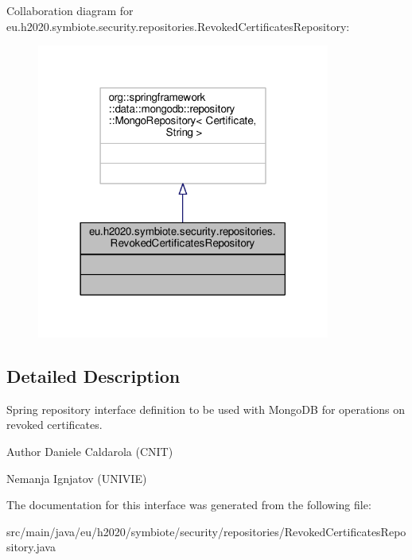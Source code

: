 Collaboration diagram for eu.\+h2020.\+symbiote.\+security.\+repositories.\+Revoked\+Certificates\+Repository\+:
\nopagebreak
\begin{figure}[H]
\begin{center}
\leavevmode
\includegraphics[width=273pt]{interfaceeu_1_1h2020_1_1symbiote_1_1security_1_1repositories_1_1RevokedCertificatesRepository__coll__graph}
\end{center}
\end{figure}


\subsection{Detailed Description}
Spring repository interface definition to be used with Mongo\+DB for operations on revoked certificates.

\begin{DoxyAuthor}{Author}
Daniele Caldarola (C\+N\+IT) 

Nemanja Ignjatov (U\+N\+I\+V\+IE) 
\end{DoxyAuthor}


The documentation for this interface was generated from the following file\+:\begin{DoxyCompactItemize}
\item 
src/main/java/eu/h2020/symbiote/security/repositories/Revoked\+Certificates\+Repository.\+java\end{DoxyCompactItemize}
